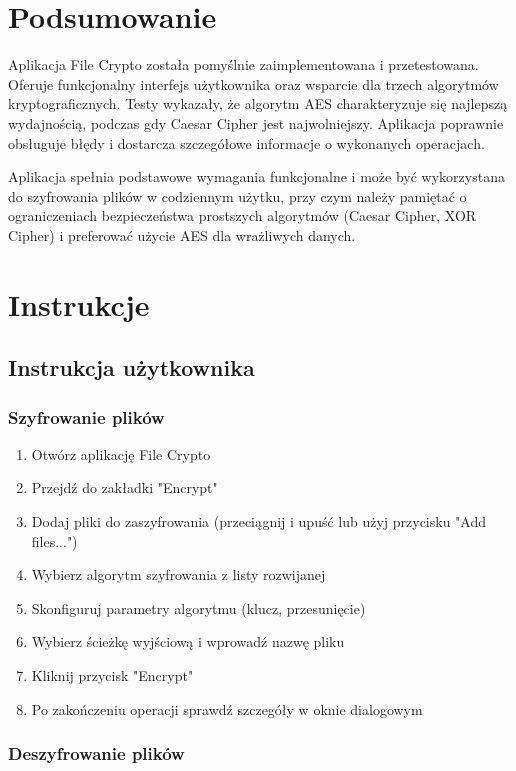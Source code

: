 \documentclass[12pt,a4paper]{article}
\begin{document}
\section{Podsumowanie}

Aplikacja File Crypto została pomyślnie zaimplementowana i przetestowana. Oferuje funkcjonalny interfejs użytkownika oraz wsparcie dla trzech algorytmów kryptograficznych. Testy wykazały, że algorytm AES charakteryzuje się najlepszą wydajnością, podczas gdy Caesar Cipher jest najwolniejszy. Aplikacja poprawnie obsługuje błędy i dostarcza szczegółowe informacje o wykonanych operacjach.

Aplikacja spełnia podstawowe wymagania funkcjonalne i może być wykorzystana do szyfrowania plików w codziennym użytku, przy czym należy pamiętać o ograniczeniach bezpieczeństwa prostszych algorytmów (Caesar Cipher, XOR Cipher) i preferować użycie AES dla wrażliwych danych.

\section{Instrukcje}

\subsection{Instrukcja użytkownika}

\subsubsection{Szyfrowanie plików}

\begin{enumerate}
\item Otwórz aplikację File Crypto
\item Przejdź do zakładki "Encrypt"
\item Dodaj pliki do zaszyfrowania (przeciągnij i upuść lub użyj przycisku "Add files...")
\item Wybierz algorytm szyfrowania z listy rozwijanej
\item Skonfiguruj parametry algorytmu (klucz, przesunięcie)
\item Wybierz ścieżkę wyjściową i wprowadź nazwę pliku
\item Kliknij przycisk "Encrypt"
\item Po zakończeniu operacji sprawdź szczegóły w oknie dialogowym
\end{enumerate}

\subsubsection{Deszyfrowanie plików}
\end{document}
